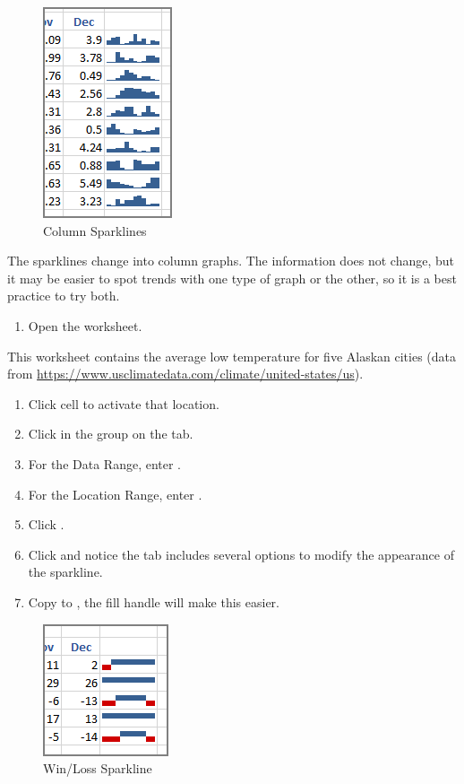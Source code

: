 \begin{figure}[H]
	\centering
	\includegraphics[width=\maxwidth{.95\linewidth}]{gfx/ch08_fig05}
	\caption{Column Sparklines}
	\label{08:fig05}
\end{figure}

The sparklines change into column graphs. The information does not change, but it may be easier to spot trends with one type of graph or the other, so it is a best practice to try both.

\begin{enumerate}[resume]
	\item Open the  worksheet.
\end{enumerate}

This worksheet contains the average low temperature for five Alaskan cities (data from  \url{https://www.usclimatedata.com/climate/united-states/us}).

\begin{enumerate}[resume]
	\item Click cell  to activate that location.
	\item Click  in the  group on the  tab.
	\item For the Data Range, enter .
	\item For the Location Range, enter .
	\item Click .
	\item Click  and notice the  tab includes several options to modify the appearance of the sparkline. 
	\item Copy  to , the fill handle will make this easier.
\end{enumerate}

\begin{figure}[H]
	\centering
	\includegraphics[width=\maxwidth{.95\linewidth}]{gfx/ch08_fig06}
	\caption{Win/Loss Sparkline}
	\label{08:fig06}
\end{figure}

